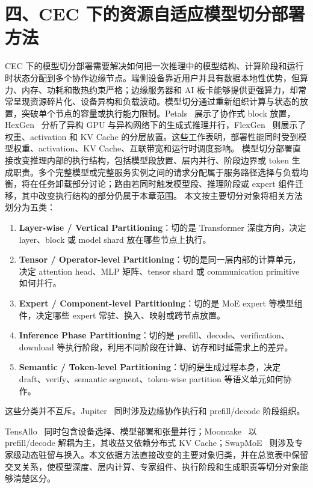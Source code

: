 \clearpage
{}
\section*{四、CEC 下的资源自适应模型切分部署方法}

CEC 下的模型切分部署需要解决如何把一次推理中的模型结构、计算阶段和运行时状态分配到多个协作边缘节点。端侧设备靠近用户并具有数据本地性优势，但算力、内存、功耗和散热约束严格；边缘服务器和 AI 板卡能够提供更强算力，却常常呈现资源碎片化、设备异构和负载波动。模型切分通过重新组织计算与状态的放置，突破单个节点的容量或执行能力限制。Petals~\cite{borzunov2023petals} 展示了协作式 block 放置，HexGen~\cite{jiang2023hexgen} 分析了异构 GPU 与异构网络下的生成式推理并行，FlexGen~\cite{sheng2023flexgen} 则展示了权重、activation 和 KV Cache 的分层放置。这些工作表明，部署性能同时受到模型权重、activation、KV Cache、互联带宽和运行时调度影响。
模型切分部署直接改变推理内部的执行结构，包括模型段放置、层内并行、阶段边界或 token 生成职责。多个完整模型或完整服务实例之间的请求分配属于服务路径选择与负载均衡，将在任务卸载部分讨论；路由若同时触发模型段、推理阶段或 expert 组件迁移，其中改变执行结构的部分仍属于本章范围。
本文按主要切分对象将相关方法划分为五类：
\begin{enumerate}
\item \textbf{Layer-wise / Vertical Partitioning}：切的是 Transformer 深度方向，决定 layer、block 或 model shard 放在哪些节点上执行。
\item \textbf{Tensor / Operator-level Partitioning}：切的是同一层内部的计算单元，决定 attention head、MLP 矩阵、tensor shard 或 communication primitive 如何并行。
\item \textbf{Expert / Component-level Partitioning}：切的是 MoE expert 等模型组件，决定哪些 expert 常驻、换入、映射或跨节点放置。
\item \textbf{Inference Phase Partitioning}：切的是 prefill、decode、verification、download 等执行阶段，利用不同阶段在计算、访存和时延需求上的差异。
\item \textbf{Semantic / Token-level Partitioning}：切的是生成过程本身，决定 draft、verify、semantic segment、token-wise partition 等语义单元如何协作。
\end{enumerate}

这些分类并不互斥。Jupiter~\cite{ye2025jupiter} 同时涉及边缘协作执行和 prefill/decode 阶段组织。

TensAllo~\cite{zhang2025tensallo} 同时包含设备选择、模型部署和张量并行；Mooncake~\cite{qin2025mooncake} 以 prefill/decode 解耦为主，其收益又依赖分布式 KV Cache；SwapMoE~\cite{kong2024swapmoe} 则涉及专家级动态驻留与换入。本文依据方法直接改变的主要对象归类，并在总览表中保留交叉关系，使模型深度、层内计算、专家组件、执行阶段和生成职责等切分对象能够清楚区分。

